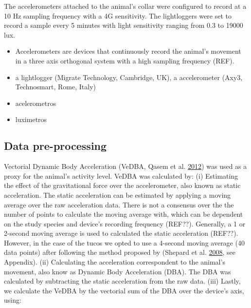 \documentclass[msc,numbers,hidelinks]{coppe}
\providecommand{\tightlist}{%
  \setlength{\itemsep}{0pt}\setlength{\parskip}{0pt}}
\begin{document}
  The accelerometers attached to the animal's collar were configured to record at a 10 Hz sampling frequency with a 4G sensitivity. The lightloggers were set to record a sample every 5 minutes with light sensitivity ranging from 0.3 to 19000 lux.
  \begin{itemize}
  \tightlist
  \item
    Accelerometers are devices that continuously record the animal's movement in a three axis orthogonal system with a high sampling frequency (REF).
  \item
    a lightlogger (Migrate Technology, Cambridge, UK), a accelerometer (Axy3, Technosmart, Rome, Italy)
  \item
    acelerometros
  \item
    luximetros
  \end{itemize}
  \hypertarget{data-pre-processing}{%
  \subsection{Data pre-processing}\label{data-pre-processing}}

  Vectorial Dynamic Body Acceleration (VeDBA, Qasem et al. \protect\hyperlink{ref-qasemTriAxialDynamicAcceleration2012}{2012}) was used as a proxy for the animal's activity level. VeDBA was calculated by: (i) Estimating the effect of the gravitational force over the accelerometer, also known as static acceleration. The static acceleration can be estimated by applying a moving average over the raw acceleration data. There is not a consensus over the the number of points to calculate the moving average with, which can be dependent on the study species and device's recording frequency (REF??). Generally, a 1 or 2-second moving average is used to calculated the static acceleration (REF??). However, in the case of the tucos we opted to use a 4-second moving average (40 data points) after following the method proposed by (Shepard et al. \protect\hyperlink{ref-shepardDerivationBodyMotion2008}{2008}, see Appendix). (ii) Calculating the acceleration correspondent to the animal's movement, also know as Dynamic Body Acceleration (DBA). The DBA was calculated by subtracting the static acceleration from the raw data. (iii) Lastly, we calculate the VeDBA by the vectorial sum of the DBA over the device's axis, using:
\end{document}
